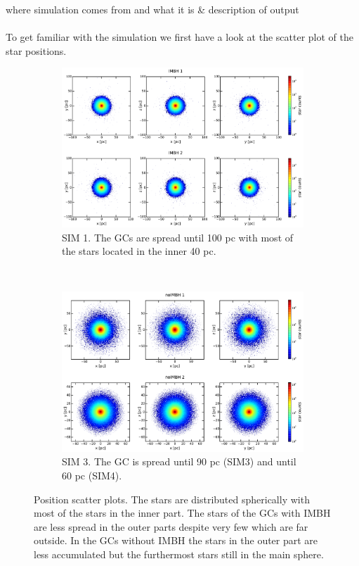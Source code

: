 \color{red}where simulation comes from and what it is \& description of output \color{black}\\
\\
To get familiar with the simulation we first have a look at the scatter plot of the star positions.
\begin{figure}[htbp] 
\centering
\begin{subfigure}{0.9\textwidth}
	\centering
  	\includegraphics[width=\textwidth]{Plots/position_scatter_plot_IMBH.pdf}
  	\caption{SIM 1. The \acp{GC} are spread until 100 pc with most of the stars located in the inner 40 pc.}
 	\label{fig:pos_scat_IMBH}
\end{subfigure}
\\
\begin{subfigure}{0.9\textwidth}
	\centering
  	\includegraphics[width=\textwidth]{Plots/position_scatter_plot_noIMBH.pdf}
  	\caption{SIM 3. The \ac{GC} is spread until 90 pc (SIM3) and until 60 pc (SIM4).}
 	\label{fig:pos_scat_noIMBH}
\end{subfigure}

\caption{Position scatter plots. The stars are distributed spherically with most of the stars in the inner part. The stars of the \acp{GC} with \ac{IMBH} are less spread in the outer parts despite very few which are far outside. In the \acp{GC} without \ac{IMBH} the stars in the outer part are less accumulated but the furthermost stars still in the main sphere.}
\label{fig:position_scatter}
\end{figure}

